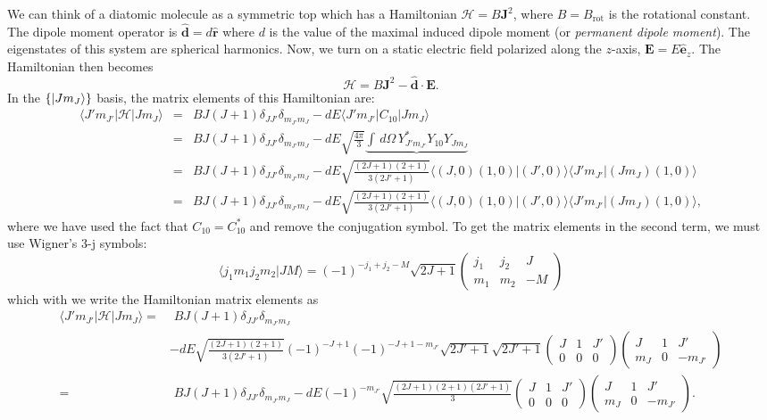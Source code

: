 \documentclass{article}
\theoremstyle{definition}
\newcommand{\nn}{\nonumber}
\newcommand{\ham}{\mathcal{H}}
\newcommand{\f}[2]{\frac{#1}{#2}}
\newcommand{\tj}[6]{ \begin{pmatrix}
		#1 & #2 & #3 \\
		#4 & #5 & #6 
\end{pmatrix}}
\begin{document}
We can think of a diatomic molecule as a symmetric top which has a Hamiltonian $\mathcal{H} = B\mathbf{J}^2$, where $B = B_\text{rot}$ is the rotational constant. The dipole moment operator is $\hat{\mathbf{d}} = d \hat{\mathbf{r}}$ where $d$ is the value of the maximal induced dipole moment (or \textit{permanent dipole moment}). The eigenstates of this system are spherical harmonics. Now, we turn on a static electric field polarized along the $z$-axis, $\bm{E} = E\hat{\bm{e}}_z$. The Hamiltonian then becomes
\begin{equation}
\ham = B \bm{J}^2 - \hat{\bm{d}} \cdot \bm{E}.
\end{equation}
In the $\{ \ket{J m_J} \}$ basis, the matrix elements of this Hamiltonian are:
\begin{eqnarray}
\langle J' m_{J'} | \ham | J m_J \rangle 
&=&  B J(J+1)\delta_{JJ'}\delta_{m_{J'}m_J} - dE \langle J' m_{J'} | C_{10} | J m_J \rangle \nn \\
&=& B J(J+1)\delta_{JJ'}\delta_{m_{J'}m_J} - dE \sqrt{\f{4\pi}{3}} \underbrace{\int \,d\Omega \, Y_{J' m_{J'}}^* Y_{10} Y_{J m_J}} \nn \\
&=& B J(J+1)\delta_{JJ'}\delta_{m_{J'}m_J} -dE  \sqrt{\f{(2J+1)(2+1)}{3(2J'+1)}} \langle (J, 0) (1,0) | (J', 0)  \rangle  \langle J' m_{J'}|(J m_J)(1,0)\rangle \nn \\
&=& B J(J+1)\delta_{JJ'}\delta_{m_{J'}m_J} -dE  \sqrt{\f{(2J+1)(2+1)}{3(2J'+1)}} \langle (J, 0) (1,0) | (J', 0)  \rangle  \langle J' m_{J'}|(J m_J)(1,0)\rangle,
\end{eqnarray}
where we have used the fact that $C_{10} = C_{10}^*$ and remove the conjugation symbol. To get the matrix elements in the second term, we must use Wigner's 3-j symbols:
\begin{equation}
\langle j_1 m_1 j_2 m_2 | J M \rangle = (-1)^{-j_1 +j_2 -M} \sqrt{2J+1} 
\tj{j_1}{j_2}{J}{m_1}{m_2}{-M}
\end{equation}
which with we write the Hamiltonian matrix elements as 
\begin{align}
\langle J' m_{J'} | \ham | J m_J \rangle 
=&\,\,B J(J+1)\delta_{JJ'}\delta_{m_{J'}m_J} \nn \\
&-dE \sqrt{\f{(2J+1)(2+1)}{3(2J'+1)}} 
(-1)^{-J + 1} (-1)^{-J + 1 -m_{J'}} \sqrt{2J'+1} \sqrt{2J'+1} \tj{J}{1}{J'}{0}{0}{0} 
\tj{J}{1}{J'}{m_J}{0}{-m_{J'}} \nn \\
= &\,\, B J(J+1)\delta_{JJ'}\delta_{m_{J'}m_J}  -dE (-1)^{-m_{J'}} \sqrt{\f{(2J+1)(2+1)(2J'+1)}{3}} \tj{J}{1}{J'}{0}{0}{0} \tj{J}{1}{J'}{m_J}{0}{-m_{J'}}.
\end{align}




 
	
\end{document}
